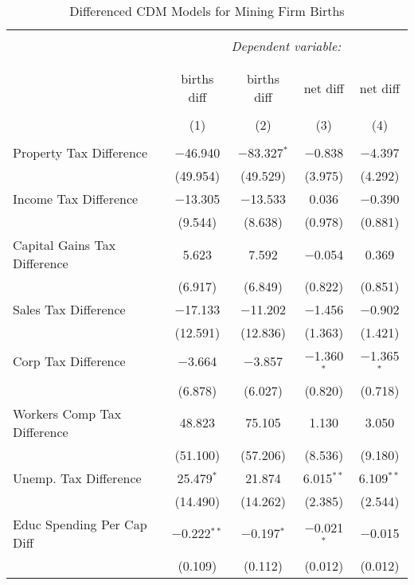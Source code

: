 
\begin{table}[!htbp] \centering 
  \caption{Differenced CDM Models for  Mining Firm Births} 
  \label{} 
\begin{tabular}{@{\extracolsep{5pt}}lcccc} 
\\[-1.8ex]\hline 
\hline \\[-1.8ex] 
 & \multicolumn{4}{c}{\textit{Dependent variable:}} \\ 
\cline{2-5} 
\\[-1.8ex] & \multicolumn{4}{c}{ } \\ 
 & births diff & births diff & net diff & net diff \\ 
\\[-1.8ex] & (1) & (2) & (3) & (4)\\ 
\hline \\[-1.8ex] 
 Property Tax Difference & $-$46.940 & $-$83.327$^{*}$ & $-$0.838 & $-$4.397 \\ 
  & (49.954) & (49.529) & (3.975) & (4.292) \\ 
  Income Tax Difference & $-$13.305 & $-$13.533 & 0.036 & $-$0.390 \\ 
  & (9.544) & (8.638) & (0.978) & (0.881) \\ 
  Capital Gains Tax Difference & 5.623 & 7.592 & $-$0.054 & 0.369 \\ 
  & (6.917) & (6.849) & (0.822) & (0.851) \\ 
  Sales Tax Difference & $-$17.133 & $-$11.202 & $-$1.456 & $-$0.902 \\ 
  & (12.591) & (12.836) & (1.363) & (1.421) \\ 
  Corp Tax Difference & $-$3.664 & $-$3.857 & $-$1.360$^{*}$ & $-$1.365$^{*}$ \\ 
  & (6.878) & (6.027) & (0.820) & (0.718) \\ 
  Workers Comp Tax Difference & 48.823 & 75.105 & 1.130 & 3.050 \\ 
  & (51.100) & (57.206) & (8.536) & (9.180) \\ 
  Unemp. Tax Difference & 25.479$^{*}$ & 21.874 & 6.015$^{**}$ & 6.109$^{**}$ \\ 
  & (14.490) & (14.262) & (2.385) & (2.544) \\ 
  Educ Spending Per Cap Diff & $-$0.222$^{**}$ & $-$0.197$^{*}$ & $-$0.021$^{*}$ & $-$0.015 \\ 
  & (0.109) & (0.112) & (0.012) & (0.012) \\ 

\end{tabular}
\end{table}
